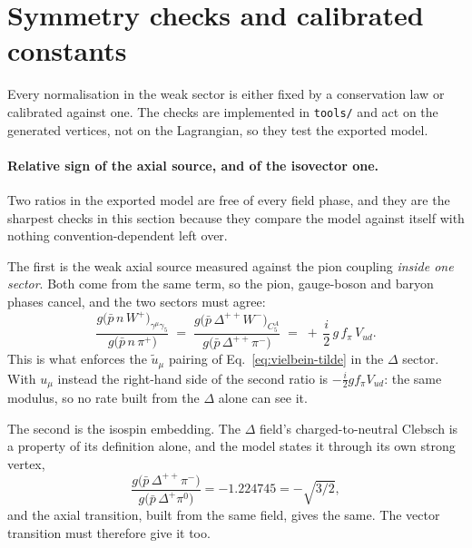 \documentclass[11pt,a4paper]{article}
\newcommand{\code}[1]{\texttt{\small #1}}
\begin{document}
\section{Symmetry checks and calibrated constants}
\label{sec:checks}

Every normalisation in the weak sector is either fixed by a conservation law or
calibrated against one. The checks are implemented in \code{tools/} and act on
the generated vertices, not on the Lagrangian, so they test the exported model.

\paragraph{Relative sign of the axial source, and of the isovector one.}
\label{par:signs}
Two ratios in the exported model are free of every field phase, and they are the
sharpest checks in this section because they compare the model against itself
with nothing convention-dependent left over.

The first is the weak axial source measured against the pion coupling
\emph{inside one sector}. Both come from the same term, so the pion, gauge-boson
and baryon phases cancel, and the two sectors must agree:
\begin{equation}
  \frac{g\big(\bar p\, n\, W^+\big)_{\gamma^\mu\gamma_5}}
       {g\big(\bar p\, n\, \pi^+\big)}
  \;=\;
  \frac{g\big(\bar p\, \Delta^{++} W^-\big)_{C_5^A}}
       {g\big(\bar p\, \Delta^{++}\pi^-\big)}
  \;=\; +\,\frac{i}{2}\,g\,f_\pi\,V_{ud} .
  \label{eq:axsign}
\end{equation}
This is what enforces the $\tilde u_\mu$ pairing of
Eq.~\eqref{eq:vielbein-tilde} in the $\Delta$ sector. With $u_\mu$ instead the
right-hand side of the second ratio is $-\tfrac{i}{2} g f_\pi V_{ud}$: the same
modulus, so no rate built from the $\Delta$ alone can see it.

The second is the isospin embedding. The $\Delta$ field's charged-to-neutral
Clebsch is a property of its definition alone, and the model states it through
its own strong vertex,
\begin{equation}
  \frac{g\big(\bar p\,\Delta^{++}\pi^-\big)}
       {g\big(\bar p\,\Delta^{+}\pi^0\big)} = -1.224745 = -\sqrt{3/2},
  \label{eq:clebsch}
\end{equation}
and the axial transition, built from the same field, gives the same. The vector
transition must therefore give it too.
\end{document}
